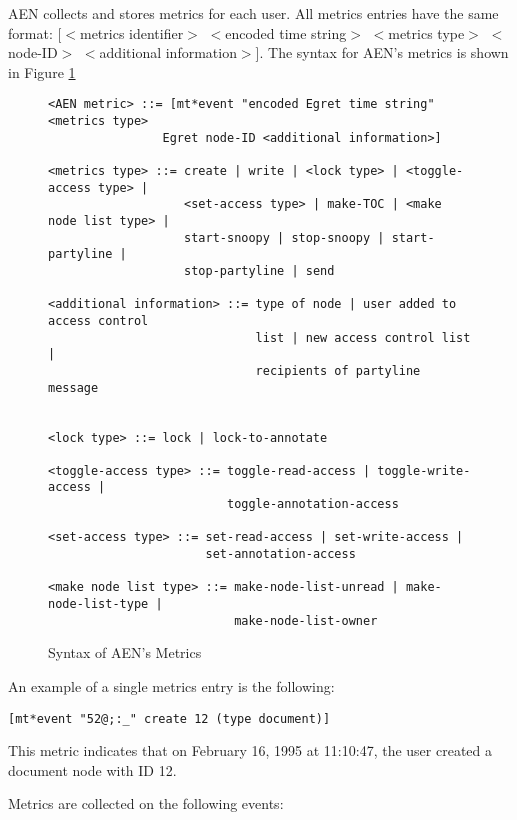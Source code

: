 AEN collects and stores metrics for each user.  All metrics entries have
the same format:  [$<$metrics identifier$>$ $<$encoded time string$>$
$<$metrics type$>$ $<$node-ID$>$ $<$additional information$>$].  The syntax
for AEN's metrics is shown in Figure \ref{fig:BNF}
\small
\begin{figure}
  \begin{verbatim}
<AEN metric> ::= [mt*event "encoded Egret time string" <metrics type>
                Egret node-ID <additional information>]

<metrics type> ::= create | write | <lock type> | <toggle-access type> | 
                   <set-access type> | make-TOC | <make node list type> |
                   start-snoopy | stop-snoopy | start-partyline | 
                   stop-partyline | send

<additional information> ::= type of node | user added to access control 
                             list | new access control list | 
                             recipients of partyline message


<lock type> ::= lock | lock-to-annotate 

<toggle-access type> ::= toggle-read-access | toggle-write-access |
                         toggle-annotation-access 

<set-access type> ::= set-read-access | set-write-access |
                      set-annotation-access

<make node list type> ::= make-node-list-unread | make-node-list-type |
                          make-node-list-owner 

\end{verbatim}
\caption{Syntax of AEN's Metrics}
\label{fig:BNF}
\end{figure}
\normalsize

 An example
of a single metrics entry is the following:

\small
\begin{verbatim}
[mt*event "52@;:_" create 12 (type document)]
\end{verbatim}
\normalsize

This metric indicates that on February 16, 1995 at 11:10:47, the user
created a document node with ID 12.

Metrics are collected on the following events:

